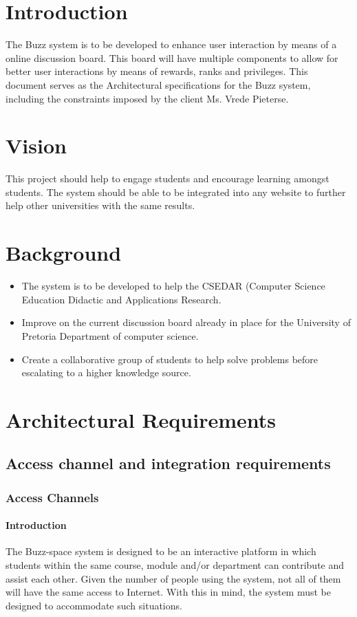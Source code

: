 \documentclass[10pt]{article}
\begin{document}
\section{Introduction}
The Buzz system is to be developed to enhance user interaction by means of a online discussion board. This board will have multiple components to allow for better user interactions by means of rewards, ranks and privileges. This document serves as the Architectural specifications for the Buzz system, including the constraints imposed by the client Ms. Vrede Pieterse.

\section{Vision}
This project should help to engage students and encourage learning amongst students. The system should be able to be integrated into any website to further help other universities with the same results.

\section{Background}
\begin{itemize}
\item The system is to be developed to help the CSEDAR (Computer Science Education Didactic and Applications Research.
\item Improve on the current discussion board already in place for the University of Pretoria Department of computer science.
\item Create a collaborative group of students to help solve problems before escalating to a higher knowledge source.
\end{itemize}


\section{Architectural Requirements}
\subsection{Access channel and integration requirements} 
\subsubsection{Access Channels}
\paragraph{Introduction}
The Buzz-space system is designed to be an interactive platform in which students within the same course, module and/or department can contribute and assist each other. Given the number of people using the system, not all of them will have the same access to Internet. With this in mind, the system must be designed to accommodate such situations.
\end{document}
